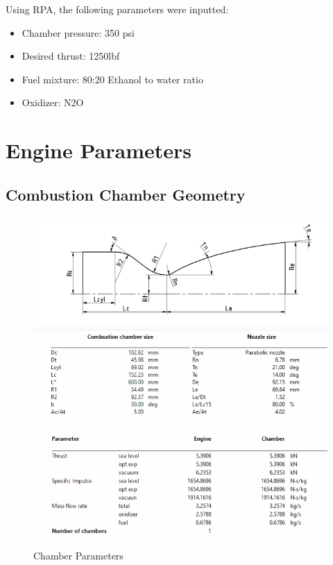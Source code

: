 Using RPA, the following parameters were inputted:
\begin{itemize}
    \item Chamber pressure: 350 psi
    \item Desired thrust: 1250lbf
    \item Fuel mixture: 80:20 Ethanol to water ratio
    \item Oxidizer: N2O 
\end{itemize}
\section{Engine Parameters}



\subsection{Combustion Chamber Geometry}
\begin{figure}[H]
    \centering
    \includegraphics[width=0.75\linewidth]{Images/motordata_final.png}
    \caption{Chamber Parameters}
    \label{fig:enter-label}
\end{figure}

